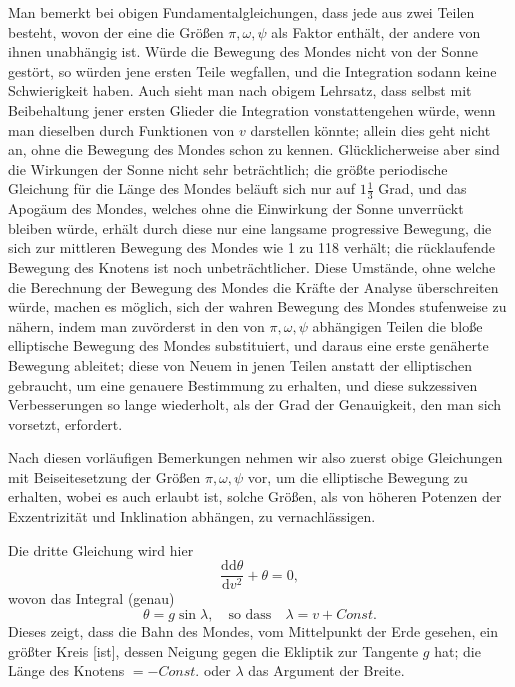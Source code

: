 \par\noindent\hspace*{\parindent}Man bemerkt bei obigen Fundamentalgleichungen, dass jede aus zwei
Teilen besteht, wovon der eine die Größen \(\pi,\omega,\psi\) als Faktor
enthält, der andere von ihnen unabhängig ist. Würde die Bewegung des Mondes
nicht von der Sonne gestört, so würden jene ersten Teile wegfallen, und die
Integration sodann keine Schwierigkeit haben. Auch sieht man nach obigem
Lehrsatz, dass selbst mit Beibehaltung jener ersten Glieder die Integration
vonstattengehen würde, wenn man dieselben durch Funktionen von \(v\)
darstellen könnte; allein dies geht nicht an, ohne die Bewegung des Mondes
schon zu kennen. Glücklicherweise aber sind die Wirkungen der Sonne nicht
sehr beträchtlich; die größte periodische Gleichung für die Länge des Mondes
beläuft sich nur auf \(1\tfrac13\) Grad, und das Apogäum des Mondes, welches
ohne die Einwirkung der Sonne unverrückt bleiben würde, erhält durch diese
nur eine langsame progressive Bewegung, die sich zur mittleren Bewegung des
Mondes wie 1 zu 118 verhält; die rücklaufende Bewegung des Knotens ist noch
unbeträchtlicher. Diese Umstände, ohne welche die Berechnung der Bewegung
des Mondes die Kräfte der Analyse überschreiten würde, machen es möglich,
sich der wahren Bewegung des Mondes stufenweise zu nähern, indem man
zuvörderst in den von \(\pi,\omega,\psi\) abhängigen Teilen die bloße
elliptische Bewegung des Mondes substituiert, und daraus eine erste genäherte
Bewegung ableitet; diese von Neuem in jenen Teilen anstatt der elliptischen
gebraucht, um eine genauere Bestimmung zu erhalten, und diese sukzessiven
Verbesserungen so lange wiederholt, als der Grad der Genauigkeit, den man
sich vorsetzt, erfordert.

\par\noindent\hspace*{\parindent}Nach diesen vorläufigen Bemerkungen nehmen wir also zuerst obige
Gleichungen mit Beiseitesetzung der Größen \(\pi,\omega,\psi\) vor, um die
elliptische Bewegung zu erhalten, wobei es auch erlaubt ist, solche Größen,
als von höheren Potenzen der Exzentrizität und Inklination abhängen, zu
vernachlässigen.

\par\noindent\hspace*{\parindent}Die dritte Gleichung wird hier
\[
\frac{\mathrm{dd}\theta}{\mathrm{d}v^2}+\theta=0,
\]
\noindent wovon das Integral (genau)
\[
\theta=g\sin\lambda,\quad\text{so dass}\quad\lambda=v+\mathit{Const.}
\]
\noindent Dieses zeigt, dass die Bahn des Mondes, vom Mittelpunkt der Erde
gesehen, ein größter Kreis [ist], dessen Neigung gegen die Ekliptik zur
Tangente \(g\) hat; die Länge des Knotens \(=-\mathit{Const.}\) oder \(\lambda\)
das Argument der Breite\HistoricalNoteEight{Aber nicht in der Bahn des Mondes,
sondern auf der Ekliptik gezählt.]}.

